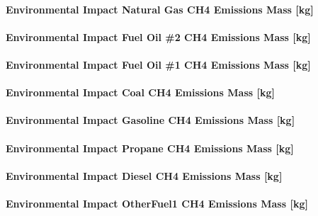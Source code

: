 \paragraph{Environmental Impact Natural Gas CH4 Emissions Mass {[}kg{]}}\label{environmental-impact-natural-gas-ch4-emissions-mass-kg}

\paragraph{Environmental Impact Fuel Oil \#2 CH4 Emissions Mass {[}kg{]}}\label{environmental-impact-fuel-oil-2-ch4-emissions-mass-kg}

\paragraph{Environmental Impact Fuel Oil \#1 CH4 Emissions Mass {[}kg{]}}\label{environmental-impact-fuel-oil-1-ch4-emissions-mass-kg}

\paragraph{Environmental Impact Coal CH4 Emissions Mass {[}kg{]}}\label{environmental-impact-coal-ch4-emissions-mass-kg}

\paragraph{Environmental Impact Gasoline CH4 Emissions Mass {[}kg{]}}\label{environmental-impact-gasoline-ch4-emissions-mass-kg}

\paragraph{Environmental Impact Propane CH4 Emissions Mass {[}kg{]}}\label{environmental-impact-propane-ch4-emissions-mass-kg}

\paragraph{Environmental Impact Diesel CH4 Emissions Mass {[}kg{]}}\label{environmental-impact-diesel-ch4-emissions-mass-kg}

\paragraph{Environmental Impact OtherFuel1 CH4 Emissions Mass {[}kg{]}}\label{environmental-impact-otherfuel1-ch4-emissions-mass-kg}

